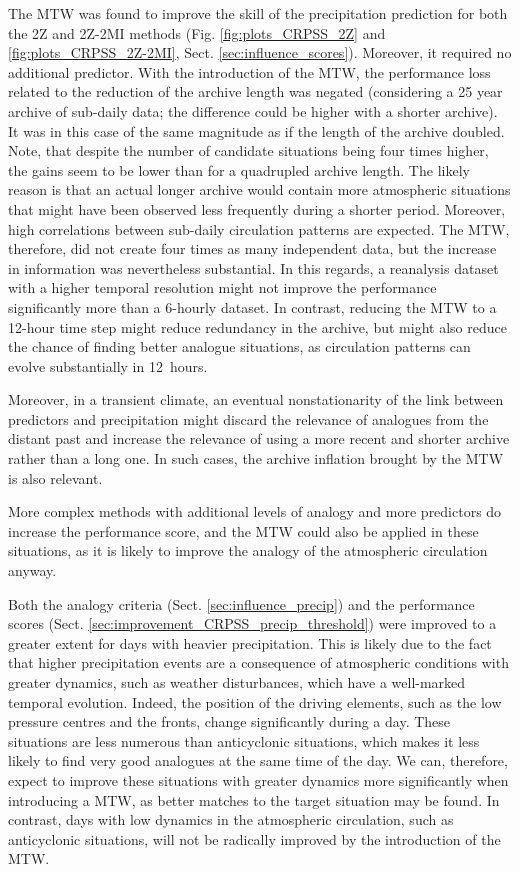\documentclass[hess, manuscript]{copernicus}
\begin{document}
	The MTW was found to improve the skill of the precipitation prediction for both the 2Z and 2Z-2MI methods (Fig. \ref{fig:plots_CRPSS_2Z} and \ref{fig:plots_CRPSS_2Z-2MI}, Sect. \ref{sec:influence_scores}). Moreover, it required no additional predictor. With the introduction of the MTW, the performance loss related to the reduction of the archive length was negated (considering a 25 year archive of sub-daily data; the difference could be higher with a shorter archive). It was in this case of the same magnitude as if the length of the archive doubled. Note, that despite the number of candidate situations being four times higher, the gains seem to be lower than for a quadrupled archive length. The likely reason is that an actual longer archive would contain more atmospheric situations that might have been observed less frequently during a shorter period. Moreover, high correlations between sub-daily circulation patterns are expected. The MTW, therefore, did not create four times as many independent data, but the increase in information was nevertheless substantial. In this regards, a reanalysis dataset with a higher temporal resolution might not improve the performance significantly more than a 6-hourly dataset. In contrast, reducing the MTW to a 12-hour time step might reduce redundancy in the archive, but might also reduce the chance of finding better analogue situations, as circulation patterns can evolve substantially in 12~hours.
	
	Moreover, in a transient climate, an eventual nonstationarity of the link between predictors and precipitation might discard the relevance of analogues from the distant past and increase the relevance of using a more recent and shorter archive rather than a long one. In such cases, the archive inflation brought by the MTW is also relevant.
	
	More complex methods with additional levels of analogy and more predictors do increase the performance score, and the MTW could also be applied in these situations, as it is likely to improve the analogy of the atmospheric circulation anyway. 
	
	Both the analogy criteria (Sect. \ref{sec:influence_precip}) and the performance scores (Sect. \ref{sec:improvement_CRPSS_precip_threshold}) were improved to a greater extent for days with heavier precipitation. This is likely due to the fact that higher precipitation events are a consequence of atmospheric conditions with greater dynamics, such as weather disturbances, which have a well-marked temporal evolution. Indeed, the position of the driving elements, such as the low pressure centres and the fronts, change significantly during a day. These situations are less numerous than anticyclonic situations, which makes it less likely to find very good analogues at the same time of the day. We can, therefore, expect to improve these situations with greater dynamics more significantly when introducing a MTW, as better matches to the target situation may be found. In contrast, days with low dynamics in the atmospheric circulation, such as anticyclonic situations, will not be radically improved by the introduction of the MTW.
	
\end{document}
